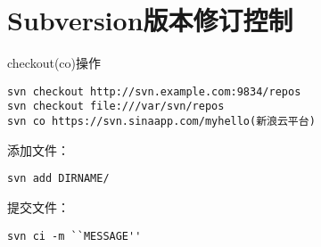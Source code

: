 \section{Subversion版本修订控制}
checkout(co)操作

\begin{verbatim}
svn checkout http://svn.example.com:9834/repos
svn checkout file:///var/svn/repos
svn co https://svn.sinaapp.com/myhello(新浪云平台) 
\end{verbatim}

添加文件：
\begin{verbatim}
svn add DIRNAME/
\end{verbatim}

提交文件：
\begin{verbatim}
svn ci -m ``MESSAGE''
\end{verbatim}






